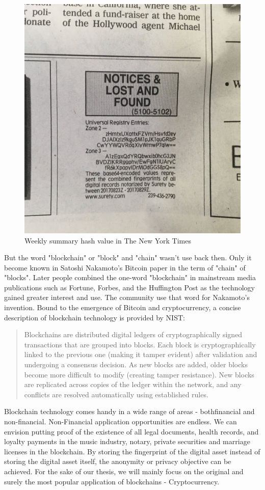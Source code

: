 \begin{figure}[h!]
	\centering
	\includegraphics[width=.35\textwidth]{images/Widely_Witnessed_Values.jpg}
	\caption[Widely-Witnessed Values of Surety, a weekly summary (hash) of documents]{Weekly summary hash value in The New York Times}
	\label{fig:first_blockchain}
\end{figure}

But the word "blockchain" or "block" and "chain" wasn't use back then. 
Only it become known in Satoshi Nakamoto's Bitcoin paper in the term of "chain" of "blocks".
Later people combined the one-word "blockchain" in mainstream media publications such as Fortune, Forbes, and the Huffington Post as the technology gained greater interest and use. 
The community use that word for Nakamoto's invention.
Bound to the emergence of Bitcoin and cryptocurrency, a concise description of blockchain technology is provided by NIST:

\begin{quote} 
	Blockchains are distributed digital ledgers of cryptographically signed transactions that are grouped into blocks. Each block is cryptographically linked to the previous one (making it tamper evident) after validation and undergoing a consensus decision. As new blocks are added, older blocks become more difficult to modify (creating tamper resistance). New blocks are replicated across copies of the ledger within the network, and any conflicts are resolved automatically using established rules.
\end{quote}

Blockchain technology comes handy in a wide range of areas - both ​financial and non-financial​. 
Non-Financial application opportunities are endless. 
We can envision putting proof of the existence of all legal documents, health records, and loyalty payments in the music industry, notary, private securities and marriage licenses in the blockchain. 
By storing the fingerprint of the digital asset instead of storing the digital asset itself, the anonymity or privacy objective can be achieved.
For the sake of our thesis, we will mainly focus on the original and surely the most popular application of blockchains - Cryptocurrency.

